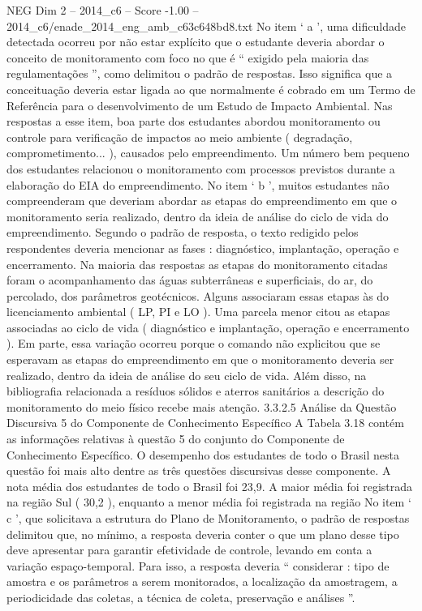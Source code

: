 \begin{textsample}{NEG Dim 2 – 2014\_c6 – Score -1.00 – 2014\_c6/enade\_2014\_eng\_amb\_c63c648bd8.txt}
No item ‘ a ’, uma dificuldade detectada ocorreu por não estar explícito que o estudante deveria abordar o conceito de monitoramento com foco no que é “ exigido pela maioria das regulamentações ”, como delimitou o padrão de respostas.
Isso significa que a conceituação deveria estar ligada ao que normalmente é cobrado em um Termo de Referência para o desenvolvimento de um Estudo de Impacto Ambiental.
Nas respostas a esse item, boa parte dos estudantes abordou monitoramento ou controle para verificação de impactos ao meio ambiente ( degradação, comprometimento... ), causados pelo empreendimento.
Um número bem pequeno dos estudantes relacionou o monitoramento com processos previstos durante a elaboração do EIA do empreendimento.
No item ‘ b ’, muitos estudantes não compreenderam que deveriam abordar as etapas do empreendimento em que o monitoramento seria realizado, dentro da ideia de análise do ciclo de vida do empreendimento.
Segundo o padrão de resposta, o texto redigido pelos respondentes deveria mencionar as fases : diagnóstico, implantação, operação e encerramento.
Na maioria das respostas as etapas do monitoramento citadas foram o acompanhamento das águas subterrâneas e superficiais, do ar, do percolado, dos parâmetros geotécnicos.
Alguns associaram essas etapas às do licenciamento ambiental ( LP, PI e LO ).
Uma parcela menor citou as etapas associadas ao ciclo de vida ( diagnóstico e implantação, operação e encerramento ).
Em parte, essa variação ocorreu porque o comando não explicitou que se esperavam as etapas do empreendimento em que o monitoramento deveria ser realizado, dentro da ideia de análise do seu ciclo de vida.
Além disso, na bibliografia relacionada a resíduos sólidos e aterros sanitários a descrição do monitoramento do meio físico recebe mais atenção. 3.3.2.5 Análise da Questão Discursiva 5 do Componente de Conhecimento Específico A Tabela 3.18 contém as informações relativas à questão 5 do conjunto do Componente de Conhecimento Específico.
O desempenho dos estudantes de todo o Brasil nesta questão foi mais alto dentre as três questões discursivas desse componente.
A nota média dos estudantes de todo o Brasil foi 23,9.
A maior média foi registrada na região Sul ( 30,2 ), enquanto a menor média foi registrada na região No item ‘ c ’, que solicitava a estrutura do Plano de Monitoramento, o padrão de respostas delimitou que, no mínimo, a resposta deveria conter o que um plano desse tipo deve apresentar para garantir efetividade de controle, levando em conta a variação espaço-temporal.
Para isso, a resposta deveria “ considerar : tipo de amostra e os parâmetros a serem monitorados, a localização da amostragem, a periodicidade das coletas, a técnica de coleta, preservação e análises ”.

\end{textsample}
